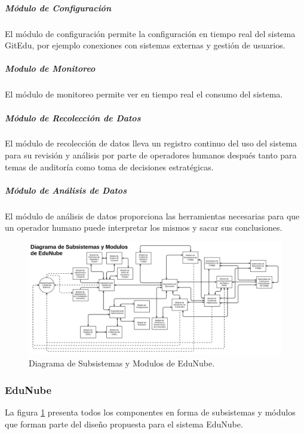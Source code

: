 \subparagraph{Módulo de Configuración}
El módulo de configuración permite la configuración en tiempo real del sistema GitEdu, por ejemplo conexiones con sistemas externas y gestión de usuarios.

\subparagraph{Modulo de Monitoreo}
El módulo de monitoreo permite ver en tiempo real el consumo del sistema.

\subparagraph{Módulo de Recolección de Datos}
El módulo de recolección de datos lleva un registro continuo del uso del sistema para su revisión y análisis por parte de operadores humanos después tanto para temas de auditoría como toma de decisiones estratégicas.

\subparagraph{Módulo de Análisis de Datos}
El módulo de análisis de datos proporciona las herramientas necesarias para que un operador humano puede interpretar los mismos y sacar sus conclusiones.

\pagebreak

\begin{landscape}

	\begin{figure}
	  \begin{center}
	    \includegraphics[width=1.7\textwidth]{Figures/mod_en.png}
	  \end{center}
	  \caption{Diagrama de Subsistemas y Modulos de EduNube.}
	  \label{mod_en}
	\end{figure}

\end{landscape}

\subsubsection{EduNube}

La figura \ref{mod_en} presenta todos los componentes en forma de subsistemas y módulos que forman parte del diseño propuesta para el sistema EduNube.

